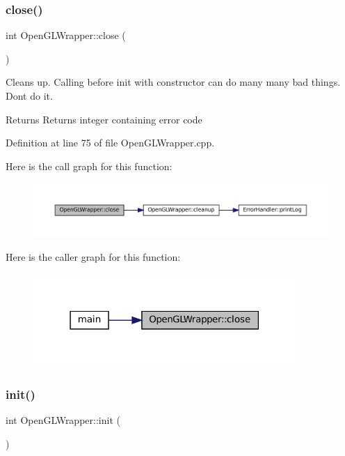 \subsubsection{\texorpdfstring{close()}{close()}}
{\footnotesize\ttfamily int Open\+G\+L\+Wrapper\+::close (\begin{DoxyParamCaption}{ }\end{DoxyParamCaption})}



Cleans up. Calling before init with constructor can do many many bad things. Dont do it. 

\begin{DoxyReturn}{Returns}
Returns integer containing error code 
\end{DoxyReturn}


Definition at line 75 of file Open\+G\+L\+Wrapper.\+cpp.

Here is the call graph for this function\+:\nopagebreak
\begin{figure}[H]
\begin{center}
\leavevmode
\includegraphics[width=350pt]{classOpenGLWrapper_af7418fa6074f3c2044b042edf19326c8_cgraph}
\end{center}
\end{figure}
Here is the caller graph for this function\+:\nopagebreak
\begin{figure}[H]
\begin{center}
\leavevmode
\includegraphics[width=283pt]{classOpenGLWrapper_af7418fa6074f3c2044b042edf19326c8_icgraph}
\end{center}
\end{figure}
\mbox{\label{classOpenGLWrapper_af99a93ae1e6a5ed7b1422b4838065e42}} 
\subsubsection{\texorpdfstring{init()}{init()}}
{\footnotesize\ttfamily int Open\+G\+L\+Wrapper\+::init (\begin{DoxyParamCaption}{ }\end{DoxyParamCaption})\hspace{0.3cm}{\ttfamily [private]}}



